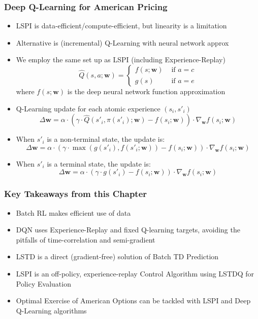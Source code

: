 \documentclass[handout]{beamer}
\begin{document}
\begin{frame}
\frametitle{Deep Q-Learning for American Pricing}
\pause
\begin{itemize}[<+->]
\item LSPI is data-efficient/compute-efficient, but linearity is a limitation
\item Alternative is (incremental) Q-Learning with neural network approx
\item We employ the same set up as LSPI (including Experience-Replay)
$$
\hat{Q}(s,a; \bm{w}) =
\begin{cases}
f(s;\bm{w}) & \text{ if } a = c \\
g(s) & \text{ if } a = e
\end{cases}
$$
where $f(s; \bm{w})$ is the deep neural network function approximation
\item Q-Learning update for each atomic experience $(s_i,s'_i)$
$$\Delta \bm{w} = \alpha \cdot (\gamma \cdot \hat{Q}(s'_i, \pi(s'_i); \bm{w}) - f(s_i;\bm{w})) \cdot \nabla_{\bm{w}} f(s_i;\bm{w})$$
\item When $s'_i$ is a non-terminal state, the update is:
$$\Delta \bm{w} =  \alpha \cdot (\gamma \cdot \max(g(s'_i), f(s'_i;\bm{w})) - f(s_i;\bm{w})) \cdot \nabla_{\bm{w}} f(s_i;\bm{w})$$
\item When $s'_i$ is a terminal state, the update is:
$$\Delta \bm{w} = \alpha \cdot (\gamma \cdot g(s'_i) - f(s_i;\bm{w})) \cdot \nabla_{\bm{w}} f(s_i;\bm{w})$$
\end{itemize}
\end{frame}

\begin{frame}
\frametitle{Key Takeaways from this Chapter}
\pause
\begin{itemize}[<+->]
\item Batch RL makes efficient use of data
\item DQN uses Experience-Replay and fixed Q-learning targets, avoiding the pitfalls of time-correlation and semi-gradient
\item LSTD is a direct (gradient-free) solution of Batch TD Prediction
\item LSPI is an off-policy, experience-replay Control Algorithm using LSTDQ for Policy Evaluation
\item Optimal Exercise of American Options can be tackled with LSPI and Deep Q-Learning algorithms
\end{itemize}
\end{frame}
\end{document}
